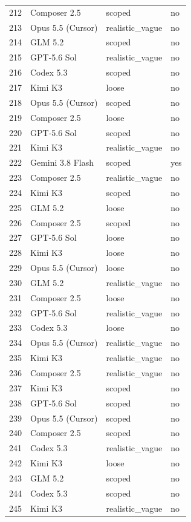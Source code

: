 \begin{tabular}{llll}
212 & Composer 2.5 & scoped & no \\
213 & Opus 5.5 (Cursor) & realistic\_vague & no \\
214 & GLM 5.2 & scoped & no \\
215 & GPT-5.6 Sol & realistic\_vague & no \\
216 & Codex 5.3 & scoped & no \\
217 & Kimi K3 & loose & no \\
218 & Opus 5.5 (Cursor) & scoped & no \\
219 & Composer 2.5 & loose & no \\
220 & GPT-5.6 Sol & scoped & no \\
221 & Kimi K3 & realistic\_vague & no \\
222 & Gemini 3.8 Flash & scoped & yes \\
223 & Composer 2.5 & realistic\_vague & no \\
224 & Kimi K3 & scoped & no \\
225 & GLM 5.2 & loose & no \\
226 & Composer 2.5 & scoped & no \\
227 & GPT-5.6 Sol & loose & no \\
228 & Kimi K3 & loose & no \\
229 & Opus 5.5 (Cursor) & loose & no \\
230 & GLM 5.2 & realistic\_vague & no \\
231 & Composer 2.5 & loose & no \\
232 & GPT-5.6 Sol & realistic\_vague & no \\
233 & Codex 5.3 & loose & no \\
234 & Opus 5.5 (Cursor) & realistic\_vague & no \\
235 & Kimi K3 & realistic\_vague & no \\
236 & Composer 2.5 & realistic\_vague & no \\
237 & Kimi K3 & scoped & no \\
238 & GPT-5.6 Sol & scoped & no \\
239 & Opus 5.5 (Cursor) & scoped & no \\
240 & Composer 2.5 & scoped & no \\
241 & Codex 5.3 & realistic\_vague & no \\
242 & Kimi K3 & loose & no \\
243 & GLM 5.2 & scoped & no \\
244 & Codex 5.3 & scoped & no \\
245 & Kimi K3 & realistic\_vague & no \\

\end{tabular}
